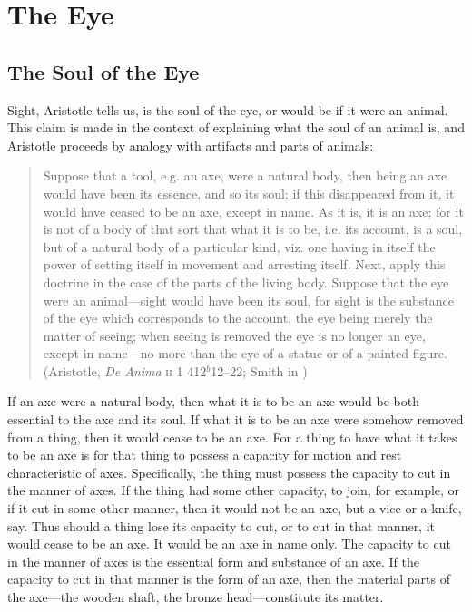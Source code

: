 \chapter{The Eye} %
\label{cha:the_eye}

\section{The Soul of the Eye} %
\label{sec:the_soul_of_the_eye}

Sight, Aristotle tells us, is the soul of the eye, or would be if it were an animal. This claim is made in the context of explaining what the soul of an animal is, and Aristotle proceeds by analogy with artifacts and parts of animals:
\begin{quote}
	Suppose that a tool, e.g. an axe, were a natural body, then being an axe would have been its essence, and so its soul; if this disappeared from it, it would have ceased to be an axe, except in name. As it is, it is an axe; for it is not of a body of that sort that what it is to be, i.e. its account, is a soul, but of a natural body of a particular kind, viz. one having in itself the power of setting itself in movement and arresting itself. Next, apply this doctrine in the case of the parts of the living body. Suppose that the eye were an animal—sight would have been its soul, for sight is the substance of the eye which corresponds to the account, the eye being merely the matter of seeing; when seeing is removed the eye is no longer an eye, except in name—no more than the eye of a statue or of a painted figure. (Aristotle, \emph{De Anima} \textsc{ii} 1 412\( ^{b} \)12--22; Smith in \citealt[22]{Barnes:1984uq})
\end{quote}

If an axe were a natural body, then what it is to be an axe would be both essential to the axe and its soul. If what it is to be an axe were somehow removed from a thing, then it would cease to be an axe. For a thing to have what it takes to be an axe is for that thing to possess a capacity for motion and rest characteristic of axes. Specifically, the thing must possess the capacity to cut in the manner of axes. If the thing had some other capacity, to join, for example, or if it cut in some other manner, then it would not be an axe, but a vice or a knife, say. Thus should a thing lose its capacity to cut, or to cut in that manner, it would cease to be an axe. It would be an axe in name only. The capacity to cut in the manner of axes is the essential form and substance of an axe. If the capacity to cut in that manner is the form of an axe, then the material parts of the axe---the wooden shaft, the bronze head---constitute its matter. 

